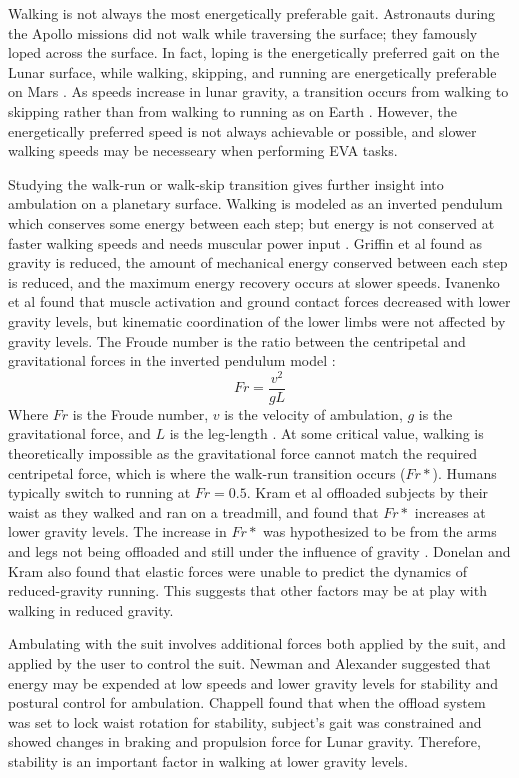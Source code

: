 \documentclass[defaultstyle,11pt]{comps}
\begin{document}
Walking is not always the most energetically preferable gait.
Astronauts during the Apollo missions did not walk while traversing the surface; they famously loped across the surface.
In fact, loping is the energetically preferred gait on the Lunar surface, while walking, skipping, and running are energetically preferable on Mars \citep{Ackermann2012b}.
As speeds increase in lunar gravity, a transition occurs from walking to skipping rather than from walking to running as on Earth \citep{Minetti2012}.
However, the energetically preferred speed is not always achievable or possible, and slower walking speeds may be necesseary when performing EVA tasks.

Studying the walk-run or walk-skip transition gives further insight into ambulation on a planetary surface.
Walking is modeled as an inverted pendulum which conserves some energy between each step; but energy is not conserved at faster walking speeds and needs muscular power input \citep{Cavagna1976, Cavagna1977}.
Griffin et al \citep{Griffin1999} found as gravity is reduced, the amount of mechanical energy conserved between each step is reduced, and the maximum energy recovery occurs at slower speeds.
Ivanenko et al \citep{Ivanenko2002} found that muscle activation and ground contact forces decreased with lower gravity levels, but kinematic coordination of the lower limbs were not affected by gravity levels.
The Froude number is the ratio between the centripetal and gravitational forces in the inverted pendulum model :
\[
Fr=\frac{v^{2}}{gL}
\]
Where \(Fr\) is the Froude number, \(v\) is the velocity of ambulation, \(g\) is the gravitational force, and \(L\) is the leg-length \citep{Alexander1989}.
At some critical value, walking is theoretically impossible as the gravitational force cannot match the required centripetal force, which is where the walk-run transition occurs (\(Fr*\)).
Humans typically switch to running at \(Fr=0.5\).
Kram et al \citep{Kram1997} offloaded subjects by their waist as they walked and ran on a treadmill, and found that \(Fr*\) increases at lower gravity levels.
The increase in \(Fr*\) was hypothesized to be from the arms and legs not being offloaded and still under the influence of gravity \citep{Kram1997}.
Donelan and Kram \citep{Donelan2000} also found that elastic forces were unable to predict the dynamics of reduced-gravity running.
This suggests that other factors may be at play with walking in reduced gravity.

Ambulating with the suit involves additional forces both applied by the suit, and applied by the user to control the suit.
Newman and Alexander \citep{Newman1993} suggested that energy may be expended at low speeds and lower gravity levels for stability and postural control for ambulation.
Chappell \citep{Chappell2006} found that when the offload system was set to lock waist rotation for stability, subject's gait was constrained and showed changes in braking and propulsion force for Lunar gravity.
Therefore, stability is an important factor in walking at lower gravity levels.
\end{document}
